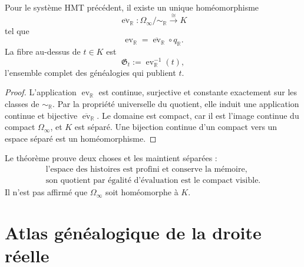 \begin{theorem}
\label{p12-83-c18-s1:thm:homeomorfismo-cociente-compacto-u024}
Pour le système HMT précédent, il existe un unique homéomorphisme
\begin{equation}
 \overline{\operatorname{ev}}_{\mathbb R}:
 \Omega_\infty/\!\sim_{\mathbb R}
 \xrightarrow{\ \cong\ }K
 \label{p12-83-c18-s1:eq:homeomorfismo-cociente-compacto-u024}
\end{equation}
tel que
\begin{equation}
 \operatorname{ev}_{\mathbb R}
 =\overline{\operatorname{ev}}_{\mathbb R}\circ q_{\mathbb R}.
 \label{p12-83-c18-s1:eq:factorizacion-evaluacion-cociente}
\end{equation}
La fibre au-dessus de \(t\in K\) est
\begin{equation}
 \mathfrak G_t
 :=\operatorname{ev}_{\mathbb R}^{-1}(t),
 \label{p12-83-c18-s1:eq:fibra-genealogias-mismo-valor}
\end{equation}
l'ensemble complet des généalogies qui publient \(t\).
\end{theorem}

\begin{proof}
L'application \(\operatorname{ev}_{\mathbb R}\) est continue, surjective et
constante exactement sur les classes de \(\sim_{\mathbb R}\). Par la
propriété universelle du quotient, elle induit une application continue et bijective
\(\overline{\operatorname{ev}}_{\mathbb R}\). Le domaine est compact, car il est
l'image continue du compact \(\Omega_\infty\), et \(K\) est séparé.
Une bijection continue d'un compact vers un espace séparé est un homéomorphisme.
\end{proof}

Le théorème prouve deux choses et les maintient séparées :
\begin{equation}
 \boxed{
 \begin{array}{c}
 \text{l’espace des histoires est profini et conserve la mémoire,}\\
 \text{son quotient par égalité d’évaluation est le compact visible.}
 \end{array}}
 \label{p12-83-c18-s1:eq:dos-niveles-continuo-u024}
\end{equation}
Il n'est pas affirmé que \(\Omega_\infty\) soit homéomorphe à \(K\).

\section{Atlas généalogique de la droite réelle}

